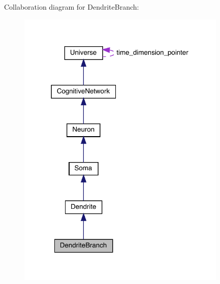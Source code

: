 Collaboration diagram for Dendrite\+Branch\+:\nopagebreak
\begin{figure}[H]
\begin{center}
\leavevmode
\includegraphics[width=283pt]{class_dendrite_branch__coll__graph}
\end{center}
\end{figure}
